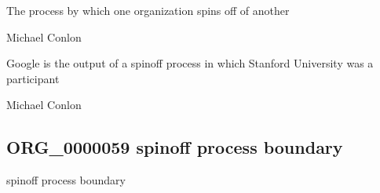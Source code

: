 \documentclass[letterpaper,10pt,english]{sphinxmanual}
\begin{document}
\begin{sphinxShadowBox}

\sphinxAtStartPar
{\hyperref[\detokenize{doc-BFO_0000015::doc}]{}}
\end{sphinxShadowBox}

\begin{sphinxShadowBox}

\sphinxAtStartPar
The process by which one organization spins off of another
\end{sphinxShadowBox}

\begin{sphinxShadowBox}

\sphinxAtStartPar
Michael Conlon 
\end{sphinxShadowBox}

\begin{sphinxShadowBox}

\sphinxAtStartPar
Google is the output of a spin\sphinxhyphen{}off process in which Stanford University was a participant
\end{sphinxShadowBox}

\begin{sphinxShadowBox}

\sphinxAtStartPar
Michael Conlon 
\end{sphinxShadowBox}
\begin{quote}

\ignorespaces \end{quote}


\subsection{ORG\_0000059 \sphinxhyphen{} spin\sphinxhyphen{}off process boundary}
\label{\detokenize{doc-ORG_0000059:org-0000059-spin-off-process-boundary}}\label{\detokenize{doc-ORG_0000059:index-0}}\label{\detokenize{doc-ORG_0000059::doc}}
\begin{sphinxShadowBox}

\sphinxAtStartPar
spin\sphinxhyphen{}off process boundary
\end{sphinxShadowBox}
\end{document}
